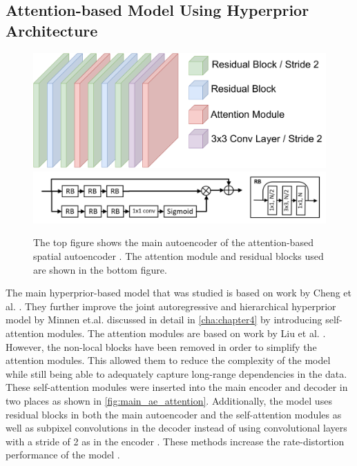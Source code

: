 \subsection{Attention-based Model Using Hyperprior Architecture\label{sec:atthyperprior}}
\begin{figure}
\centering
\includegraphics[scale=0.4]{img/Main_AE_Attention.pdf}
\includegraphics[scale=0.4]{img/attentionmodule.png}
\caption[Attention-based Model Overview]{The top figure shows the main autoencoder of the attention-based spatial autoencoder \citep{cheng_learned_2020}. The attention module and residual blocks used are shown in the bottom figure.}
\label{fig:main_ae_attention}
\end{figure}
The main hyperprior-based model that was studied is based on work by Cheng et al. \citep{cheng_learned_2020}. They further improve the joint autoregressive and hierarchical hyperprior model by Minnen et.al. \citep{minnen_joint_2018} discussed in detail in \autoref{cha:chapter4} by introducing self-attention modules. The attention modules are based on work by Liu et al. \citep{liu_non-local_2019}. However, the non-local blocks have been removed in order to simplify the attention modules. This allowed them to reduce the complexity of the model while still being able to adequately capture long-range dependencies in the data. These self-attention modules were inserted into the main encoder and decoder in two places as shown in \autoref{fig:main_ae_attention}. Additionally, the model uses residual blocks in both the main autoencoder and the self-attention modules as well as subpixel convolutions in the decoder instead of using convolutional layers with a stride of 2 as in the encoder \citep{cheng_learned_2020}. These methods increase the rate-distortion performance of the model \citep{cheng_learned_2020}.

